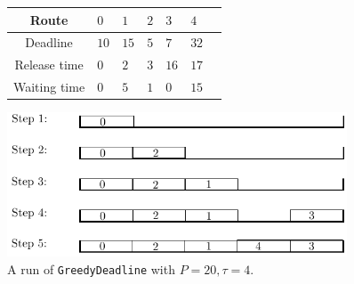 \documentclass[a4paper,10pt]{journal}
\newcommand\greedydeadline{\texttt{GreedyDeadline}\xspace}
\begin{document}
    \begin{figure}
          \begin{center}
   \begin{tabularx}{0.9\textwidth}{|c|X|X|X|X|X|X|}
    \hline
     Route& $0$ & $1$ & $2$& $3$ & $4$\\
    \hline
    Deadline & $10$ &$15$&$5$&$7$&$32$\\
    \hline
     Release time & $0$ &$2$&$3$&$16$&$17$\\
    \hline
    Waiting time & $0$ &$5$&$1$&$0$&$15$\\
    \hline
      \end{tabularx}
      
      \vspace{1cm}
      \includegraphics[width=0.9\textwidth]{examplegreedy.pdf}
      \caption{A run of \greedydeadline with $P = 20, \tau = 4$.}
           \label{fig:greedydeadline}
      \end{center}
      
    \end{figure}

     
   
\end{document}
